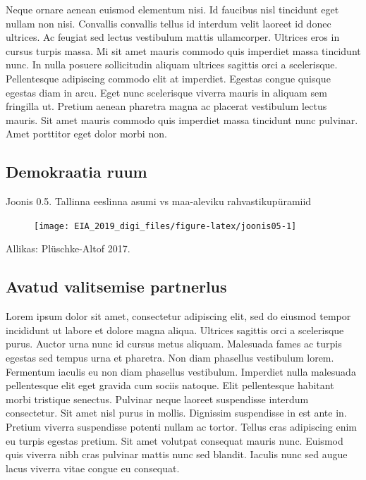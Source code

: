 \documentclass[estonian,]{article}
\begin{document}
Neque ornare aenean euismod elementum nisi. Id faucibus nisl tincidunt eget nullam non nisi. Convallis convallis tellus id interdum velit laoreet id donec ultrices. Ac feugiat sed lectus vestibulum mattis ullamcorper. Ultrices eros in cursus turpis massa. Mi sit amet mauris commodo quis imperdiet massa tincidunt nunc. In nulla posuere sollicitudin aliquam ultrices sagittis orci a scelerisque. Pellentesque adipiscing commodo elit at imperdiet. Egestas congue quisque egestas diam in arcu. Eget nunc scelerisque viverra mauris in aliquam sem fringilla ut. Pretium aenean pharetra magna ac placerat vestibulum lectus mauris. Sit amet mauris commodo quis imperdiet massa tincidunt nunc pulvinar. Amet porttitor eget dolor morbi non.

\hypertarget{demokraatia-ruum}{%
\subsection*{Demokraatia ruum}\label{demokraatia-ruum}}

{Joonis 0.5.} Tallinna eeslinna asumi vs maa-aleviku rahvastikupüramiid

\begin{figure}

{\centering \texttt{[image: EIA\_2019\_digi\_files/figure-latex/joonis05-1]} 

}

\end{figure}

\begin{imgsource}
{Allikas:} Plüschke-Altof 2017.
\end{imgsource}

\hypertarget{avatud-valitsemise-partnerlus}{%
\subsection*{Avatud valitsemise partnerlus}\label{avatud-valitsemise-partnerlus}}

Lorem ipsum dolor sit amet, consectetur adipiscing elit, sed do eiusmod tempor incididunt ut labore et dolore magna aliqua. Ultrices sagittis orci a scelerisque purus. Auctor urna nunc id cursus metus aliquam. Malesuada fames ac turpis egestas sed tempus urna et pharetra. Non diam phasellus vestibulum lorem. Fermentum iaculis eu non diam phasellus vestibulum. Imperdiet nulla malesuada pellentesque elit eget gravida cum sociis natoque. Elit pellentesque habitant morbi tristique senectus. Pulvinar neque laoreet suspendisse interdum consectetur. Sit amet nisl purus in mollis. Dignissim suspendisse in est ante in. Pretium viverra suspendisse potenti nullam ac tortor. Tellus cras adipiscing enim eu turpis egestas pretium. Sit amet volutpat consequat mauris nunc. Euismod quis viverra nibh cras pulvinar mattis nunc sed blandit. Iaculis nunc sed augue lacus viverra vitae congue eu consequat.
\end{document}

